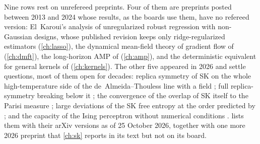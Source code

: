\begin{refsection}
Nine rows rest on unrefereed preprints. Four of them are preprints posted between 2013 and 2024 whose results, as the boards use them, have no refereed version: El~Karoui's analysis of unregularized robust regression with non-Gaussian designs, whose published revision keeps only ridge-regularized estimators (\cref{ch:lasso}), the dynamical mean-field theory of gradient flow of \textcite{CelentanoChengMontanari2021} (\cref{ch:dmft}), the long-horizon AMP of \textcite{LiWei2022} (\cref{ch:amp}), and the deterministic equivalent for general kernels of \textcite{MisiakiewiczSaeed2024} (\cref{ch:kernels}). The other five appeared in 2026 and settle questions, most of them open for decades: replica symmetry of SK on the whole high-temperature side of the de~Almeida--Thouless line with a field \parencite{Lopatto2026a,KusuokaNakajima2026b}; full replica-symmetry breaking below it \parencite{Lopatto2026b,Lopatto2026c}; the convergence of the overlap of SK itself to the Parisi measure \parencite{AronowLopatto2026b}; large deviations of the SK free entropy at the order predicted by \textcite{ParisiRizzo2009} \parencite{AronowLopatto2026a,Pei2026}; and the capacity of the Ising perceptron without numerical conditions \parencite{Shmalo2026}.  lists them with their arXiv versions as of 25 October 2026, together with one more 2026 preprint that \cref{ch:sk} reports in its text but not on its board.


\end{refsection}
